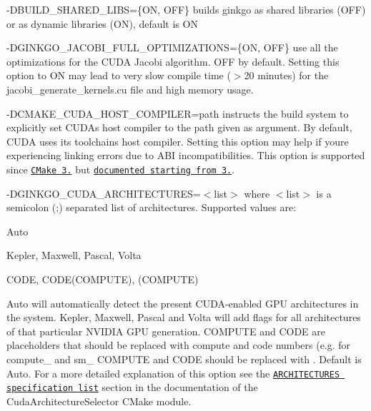 \begin{DoxyItemize}
\item {\ttfamily -\/\+D\+B\+U\+I\+L\+D\+\_\+\+S\+H\+A\+R\+E\+D\+\_\+\+L\+I\+BS=\{ON, O\+FF\}} builds ginkgo as shared libraries ({\ttfamily O\+FF}) or as dynamic libraries ({\ttfamily ON}), default is {\ttfamily ON}
\item {\ttfamily -\/\+D\+G\+I\+N\+K\+G\+O\+\_\+\+J\+A\+C\+O\+B\+I\+\_\+\+F\+U\+L\+L\+\_\+\+O\+P\+T\+I\+M\+I\+Z\+A\+T\+I\+O\+NS=\{ON, O\+FF\}} use all the optimizations for the C\+U\+DA Jacobi algorithm. {\ttfamily O\+FF} by default. Setting this option to {\ttfamily ON} may lead to very slow compile time ($>$20 minutes) for the {\ttfamily jacobi\+\_\+generate\+\_\+kernels.\+cu} file and high memory usage.
\item {\ttfamily -\/\+D\+C\+M\+A\+K\+E\+\_\+\+C\+U\+D\+A\+\_\+\+H\+O\+S\+T\+\_\+\+C\+O\+M\+P\+I\+L\+ER=path} instructs the build system to explicitly set C\+U\+DA\textquotesingle{}s host compiler to the path given as argument. By default, C\+U\+DA uses its toolchain\textquotesingle{}s host compiler. Setting this option may help if you\textquotesingle{}re experiencing linking errors due to A\+BI incompatibilities. This option is supported since \href{https://github.com/Kitware/CMake/commit/489c52ce680df6439f9c1e553cd2925ca8944cb1}{\tt C\+Make 3.} but \href{https://cmake.org/cmake/help/v3.10/variable/CMAKE_CUDA_HOST_COMPILER.html}{\tt documented starting from 3.}.
\item {\ttfamily -\/\+D\+G\+I\+N\+K\+G\+O\+\_\+\+C\+U\+D\+A\+\_\+\+A\+R\+C\+H\+I\+T\+E\+C\+T\+U\+R\+ES=$<$list$>$} where {\ttfamily $<$list$>$} is a semicolon ({\ttfamily ;}) separated list of architectures. Supported values are\+:
\begin{DoxyItemize}
\item {\ttfamily Auto}
\item {\ttfamily Kepler}, {\ttfamily Maxwell}, {\ttfamily Pascal}, {\ttfamily Volta}
\item {\ttfamily C\+O\+DE}, {\ttfamily C\+O\+D\+E(\+C\+O\+M\+P\+U\+T\+E)}, {\ttfamily (C\+O\+M\+P\+U\+TE)}
\end{DoxyItemize}

{\ttfamily Auto} will automatically detect the present C\+U\+D\+A-\/enabled G\+PU architectures in the system. {\ttfamily Kepler}, {\ttfamily Maxwell}, {\ttfamily Pascal} and {\ttfamily Volta} will add flags for all architectures of that particular N\+V\+I\+D\+IA G\+PU generation. {\ttfamily C\+O\+M\+P\+U\+TE} and {\ttfamily C\+O\+DE} are placeholders that should be replaced with compute and code numbers (e.\+g. for {\ttfamily compute\+\_} and {\ttfamily sm\+\_} {\ttfamily C\+O\+M\+P\+U\+TE} and {\ttfamily C\+O\+DE} should be replaced with {}. Default is {\ttfamily Auto}. For a more detailed explanation of this option see the \href{https://github.com/ginkgo-project/CudaArchitectureSelector/blob/master/CudaArchitectureSelector.cmake#L58}{\tt {\ttfamily A\+R\+C\+H\+I\+T\+E\+C\+T\+U\+R\+ES} specification list} section in the documentation of the Cuda\+Architecture\+Selector C\+Make module.
\end{DoxyItemize}

